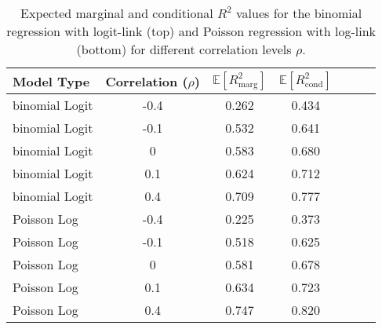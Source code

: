 \begin{table}[H]
    \centering
    \begin{tabular}{lcccccc}
    \toprule
    \textbf{Model Type} & \textbf{Correlation (\(\rho\))} & $\mathbb{E}[R^2_{\text{marg}}]$ &  $\mathbb{E}[R^2_{\text{cond}}]$ \\
    \midrule
    binomial Logit & -0.4 & 0.262 & 0.434 \\
    binomial Logit & -0.1 & 0.532 & 0.641 \\
    binomial Logit & 0    & 0.583 & 0.680 \\
    binomial Logit & 0.1  & 0.624 & 0.712 \\
    binomial Logit & 0.4  & 0.709 & 0.777 \\
    \midrule
    Poisson Log  & -0.4 & 0.225 & 0.373 \\
    Poisson Log  & -0.1 & 0.518 & 0.625 \\
    Poisson Log  & 0    & 0.581 & 0.678 \\
    Poisson Log  & 0.1  & 0.634 & 0.723 \\
    Poisson Log  & 0.4  & 0.747 & 0.820 \\
    \bottomrule
    \end{tabular}
    \caption[Expected $R^2$ for non-Gaussian GLMMs]{Expected marginal and conditional $R^2$ values for the binomial regression with logit-link (top) and Poisson regression with log-link (bottom) for different correlation levels $\rho$.}
    \label{table:r2values}
\end{table}

